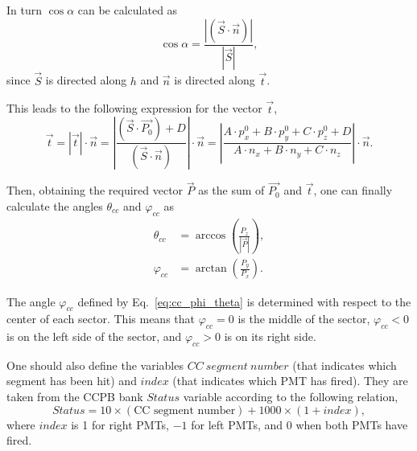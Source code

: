 In turn $\cos \alpha$ can be calculated as
\begin{equation}
\cos \alpha = \frac{|(\overrightarrow{S}\cdot \overrightarrow{n})|}{|\overrightarrow{S}|},
\end{equation}
since $\overrightarrow{S}$ is directed along $h$ and $\overrightarrow{n}$ is directed along $\overrightarrow{t}$. 



This leads to the following expression for the vector $\overrightarrow{t}$,
\begin{equation}
 \overrightarrow{t} =  | \overrightarrow{t}  |\cdot \overrightarrow{n}  =\left | \frac{(\overrightarrow{S} \cdot \overrightarrow{P_{0}})+D}{(\overrightarrow{S} \cdot \overrightarrow{n})}\right |\cdot \overrightarrow{n}   = \left | \frac{A\! \cdot\! p_{x}^{0}+B\! \cdot\! p_{y}^{0}+C\! \cdot\! p_{z}^{0}+D}{A \!\cdot\! n_{x}+B\! \cdot\! n_{y}+C \!\cdot\! n_{z}}\right |\cdot\overrightarrow{n}.
\label{eq:cc_t_vec} 
\end{equation}


Then, obtaining the required vector $\overrightarrow{P}$ as the sum of $\overrightarrow{P_{0}}$ and $\overrightarrow{t}$, one can finally calculate the angles $\theta_{cc}$ and $\varphi_{cc}$ as 
\begin{equation}
\begin{aligned}
\theta_{cc}&=\arccos\left ( \frac{P_z}{| \overrightarrow{P}  |}\right ),\\
\varphi_{cc} & =  \arctan\left ( \frac{P_{y}}{P_{x}} \right ). 
\label{eq:cc_phi_theta} 
\end{aligned}
\end{equation}

The angle $\varphi_{cc}$ defined by Eq.~\eqref{eq:cc_phi_theta} is determined with respect to the center of each sector. This means that $\varphi_{cc} = 0$ is the middle of the sector, $\varphi_{cc} < 0$ is on the left side of the sector, and $\varphi_{cc} > 0$ is on its right side.

One should also define the variables $CC~segment~number$ (that indicates which segment has been hit) and $index$ (that indicates which PMT has fired). They are taken from the CCPB bank $Status$ variable according to the following relation,
\begin{equation}
Status = 10\times(\text{CC segment number}) + 1000\times( 1 + index),
\label{eq:cc_segment}
\end{equation}
where $index$ is 1 for right PMTs, $-1$ for left PMTs, and 0 when both PMTs have fired.



